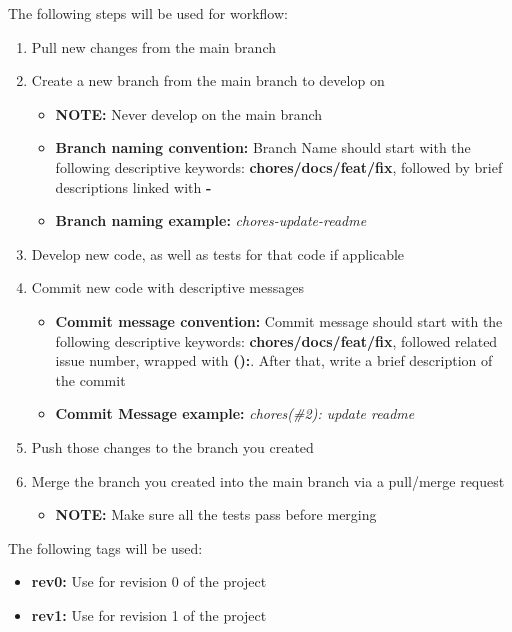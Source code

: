 \documentclass{article}
\begin{document}
The following steps will be used for workflow:
\begin{enumerate}
	\item Pull new changes from the main branch
	\item Create a new branch from the main branch to develop on
    \begin{itemize}
        \item \textbf{NOTE:} Never develop on the main branch
        \item \textbf{Branch naming convention:} Branch Name should start with the following descriptive keywords: \textbf{chores/docs/feat/fix}, followed by brief descriptions linked with \textbf{-}
        \item \textbf{Branch naming example:} \textit{chores-update-readme}
    \end{itemize}
	\item Develop new code, as well as tests for that code if applicable
	\item Commit new code with descriptive messages
        \begin{itemize}
        \item \textbf{Commit message convention:} Commit message should start with the following descriptive keywords: \textbf{chores/docs/feat/fix}, followed related issue number, wrapped with \textbf{():}. After that, write a brief description of the commit
        \item \textbf{Commit Message example:} \textit{chores(\#2): update readme}
        \end{itemize}
	\item Push those changes to the branch you created
	\item Merge the branch you created into the main branch via a pull/merge request
    \begin{itemize}
        \item \textbf{NOTE:} Make sure all the tests pass before merging \\
    \end{itemize}
\end{enumerate}

The following tags will be used:
\begin{itemize}
    \item \textbf{rev0:} Use for revision 0 of the project
    \item \textbf{rev1:} Use for revision 1 of the project \\
\end{itemize}
\end{document}
